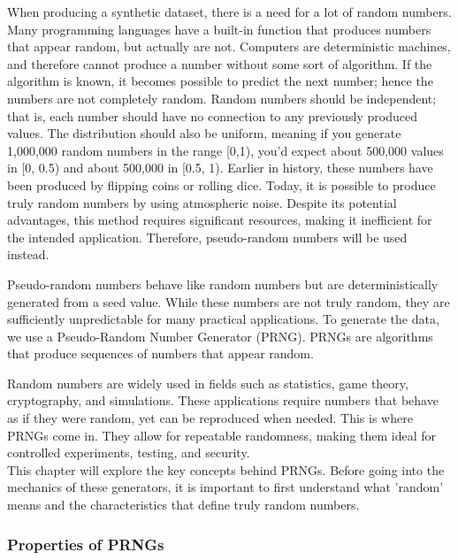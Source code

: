 When producing a synthetic dataset, there is a need for a lot of random numbers. Many programming languages have a built-in function that produces numbers that appear random, but actually are not. Computers are deterministic machines, and therefore cannot produce a number without some sort of algorithm. If the algorithm is known, it becomes possible to predict the next number; hence the numbers are not completely random. Random numbers should be independent; that is, each number should have no connection to any previously produced values. The distribution should also be uniform, meaning if you generate 1,000,000 random numbers in the range [0,1), you'd expect about 500,000 values in [0, 0.5) and about 500,000 in [0.5, 1). Earlier in history, these numbers have been produced by flipping coins or rolling dice. Today, it is possible to produce truly random numbers by using atmospheric noise. Despite its potential advantages, this method requires significant resources, making it inefficient for the intended application. Therefore, pseudo-random numbers will be used instead.
\newline

\noindent Pseudo-random numbers behave like random numbers but are deterministically generated from a seed value. While
these numbers are not truly random, they are sufficiently unpredictable for many practical applications.
To generate the data, we use a Pseudo-Random Number Generator (PRNG).
PRNGs are algorithms that produce sequences of numbers that appear random.
\newline

\noindent Random numbers are widely used in fields such as statistics, game theory, cryptography, and simulations. These applications require numbers that behave
as if they were random, yet can be reproduced when needed. This is where
PRNGs come in. They allow for repeatable randomness, making them ideal for
controlled experiments, testing, and security.
\\
This chapter will explore the key concepts behind PRNGs. Before going into the
mechanics of these generators, it is important to first understand what ’random’
means and the characteristics that define truly random numbers.

\subsubsection{Properties of PRNGs}

